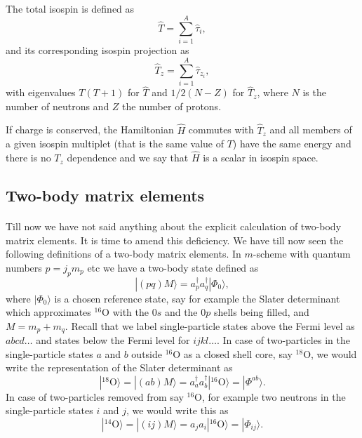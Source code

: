 \documentclass[%
twoside,                 %
final,                   %
10pt]{article}
\begin{document}
\paragraph{}
The total isospin is defined as
\[
\hat{T}=\sum_{i=1}^A\hat{\tau}_i,
\]
and its corresponding isospin projection as
\[
\hat{T}_z=\sum_{i=1}^A\hat{\tau}_{z_i},
\]
with eigenvalues $T(T+1)$ for $\hat{T}$ and $1/2(N-Z)$ for $\hat{T}_z$, where $N$ is the number of neutrons and $Z$ the number of protons. 

If charge is conserved, the Hamiltonian $\hat{H}$ commutes with $\hat{T}_z$ and all members of a given isospin multiplet
(that is the same value of $T$) have the same energy and there is no $T_z$ dependence and we say that $\hat{H}$ is a scalar in isospin space.




\subsection*{Two-body matrix elements}

\paragraph{}
Till now we have not said anything about the explicit calculation of two-body matrix elements. It is time to amend this deficiency.
We have till now seen the following definitions of a two-body matrix elements. In $m$-scheme
with quantum numbers $p=j_pm_p$ etc we have a two-body state defined as
\[
|(pq)M\rangle  = a^{\dagger}_pa^{\dagger}_q|\Phi_0\rangle,
\]
where $|\Phi_0\rangle$ is a chosen reference state, say for example the Slater determinant which approximates ${}^{16}\mbox{O}$ with the $0s$ and the $0p$ shells being filled, and $M=m_p+m_q$. Recall that we label single-particle states above the Fermi level as $abcd\dots$ and states below the Fermi level for $ijkl\dots$.  
In case of two-particles in the single-particle states $a$ and $b$ outside ${}^{16}\mbox{O}$ as a closed shell core, say ${}^{18}\mbox{O}$, 
we would write the representation of the Slater determinant as
\[
|^{18}\mathrm{O}\rangle =|(ab)M\rangle  = a^{\dagger}_aa^{\dagger}_b|^{16}\mathrm{O}\rangle=|\Phi^{ab}\rangle.
\]
In case of two-particles removed from say ${}^{16}\mbox{O}$, for example two neutrons in the single-particle states $i$ and $j$, we would write this as
\[
|^{14}\mathrm{O}\rangle =|(ij)M\rangle  = a_ja_i|^{16}\mathrm{O}\rangle=|\Phi_{ij}\rangle.
\]
\end{document}
